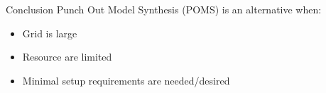 \documentclass{beamer}
\begin{document}
%







  \begin{frame}[fragile]{Conclusion}
    Punch Out Model Synthesis (POMS) is an alternative when:
    \begin{itemize}
      \item Grid is large
      \item Resource are limited
      \item Minimal setup requirements are needed/desired
    \end{itemize}
  \end{frame}
\end{document}
